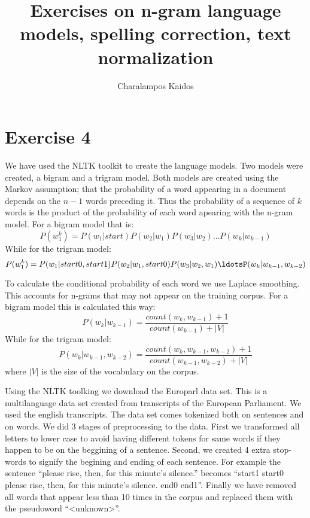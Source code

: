 \documentclass[a4paper]{article}
\begin{document}
\title{Exercises on n-gram language models, spelling correction, text normalization}
\author{Charalampos Kaidos}

\maketitle

\section*{Exercise 4}

We have used the NLTK toolkit to create the language models. Two models were
created, a bigram and a trigram model. Both models are created using the Markov
assumption; that the probability of a word appearing in a document depends on
the $n-1$ words preceding it. Thus the probability of a sequence of $k$ words is
the product of the probability of each word apearing with the n-gram model. For
a bigram model that is:
$$
P(w_1^k) = P(w_1|start)P(w_2|w_1)P(w_3|w_2)\ldots P(w_k|w_{k-1})
$$
While for the trigram model:
$$
P(w_1^k) =
P(w_1|start0,start1)P(w_2|w_1,start0)P(w_3|w_2,w_1)\ldotsP(w_k|w_{k-1},w_{k-2})
$$ 

To calculate the conditional probability of each word we use Laplace smoothing.
This accounts for n-grams that may not appear on the training corpus. For a
bigram model this is calculated this way:
$$
P(w_k|w_{k-1}) = \frac{count(w_k,w_{k-1}) + 1}{count(w_{k-1}) + |V|}
$$
While for the trigram model:
$$
P(w_k|w_{k-1},w_{k-2}) = \frac{count(w_k,w_{k-1},w_{k-2}) +
1}{count(w_{k-1},w_{k-2}) + |V|}
$$
where $|V|$ is the size of the vocabulary on the corpus.

Using the NLTK toolking we download the Europarl data set. This is a
multilanguage data set created from transcripts of the European Parliament. We
used the english transcripts. The data set comes tokenized both on sentences and
on words. We did 3 stages of preprocessing to the data. First we transformed all
letters to lower case to avoid having different tokens for same words if they
happen to be on the beggining of a sentence. Second, we created 4 extra
stop-words to signify the begining and ending of each sentence. For example
the sentence ``please rise, then, for this minute's silence.'' becomes
``start1 start0 please rise, then, for this minute's silence. end0 end1''.
Finally we have removed all words that appear less than 10 times in the corpus
and replaced them with the pseudoword ``<unknown>''.
\end{document}
